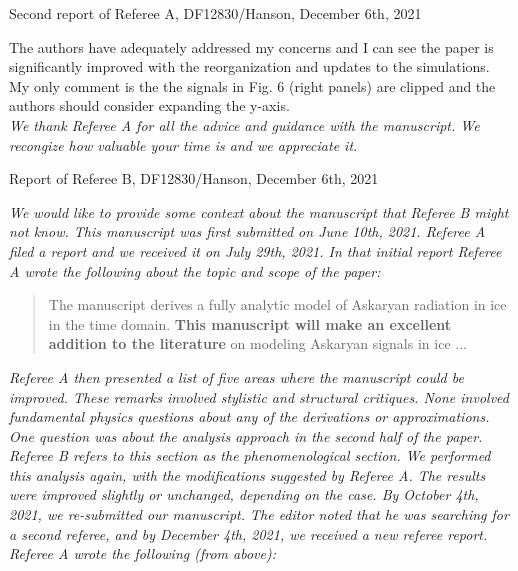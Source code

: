\documentclass[12pt]{article}
\begin{document}
Second report of Referee A, DF12830/Hanson, December 6th, 2021 \\ \vspace{0.25cm}
\hrulefill

The authors have adequately addressed my concerns and I can see the paper is significantly improved with the reorganization and updates to the simulations. My only comment is the the signals in Fig. 6 (right panels) are clipped and the authors should consider expanding the y-axis. \\

\textit{We thank Referee A for all the advice and guidance with the manuscript.  We recongize how valuable your time is and we appreciate it.} \\ \vspace{0.25cm}

Report of Referee B, DF12830/Hanson, December 6th, 2021 \\ \vspace{0.25cm}
\hrulefill

\textit{We would like to provide some context about the manuscript that Referee B might not know.  This manuscript was first submitted on June 10th, 2021.  Referee A filed a report and we received it on July 29th, 2021.  In that initial report Referee A wrote the following about the topic and scope of the paper:} \\

\begin{quote}
The manuscript derives a fully analytic model of Askaryan radiation in ice in the time domain. \textbf{This manuscript will make an excellent addition to the literature} on modeling Askaryan signals in ice ...
\end{quote}

\textit{Referee A then presented a list of five areas where the manuscript could be improved.  These remarks involved stylistic and structural critiques.  None involved fundamental physics questions about any of the derivations or approximations.  One question was about the analysis approach in the second half of the paper.  Referee B refers to this section as the phenomenological section.  We performed this analysis again, with the modifications suggested by Referee A.  The results were improved slightly or unchanged, depending on the case.  By October 4th, 2021, we re-submitted our manuscript.  The editor noted that he was searching for a second referee, and by December 4th, 2021, we received a new referee report.  Referee A wrote the following (from above):}
\end{document}
